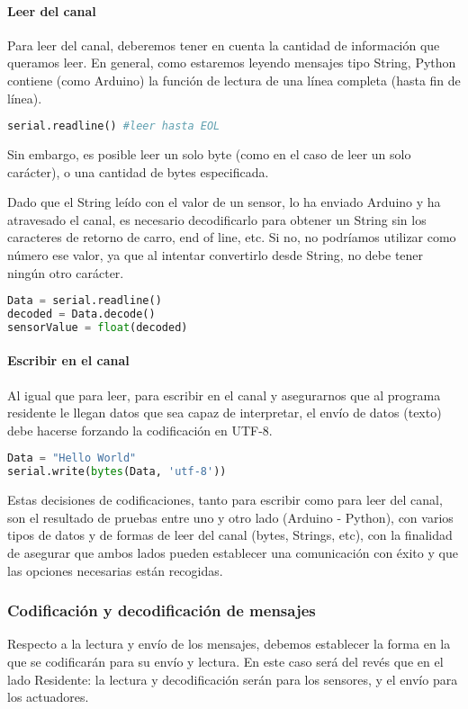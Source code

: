 \paragraph {Leer del canal} 
Para leer del canal, deberemos tener en cuenta la cantidad de información que queramos leer. En general, como estaremos leyendo mensajes tipo String, Python contiene (como Arduino) la función de lectura de una línea completa (hasta fin de línea). 
\begin{lstlisting}[language=python]
serial.readline() #leer hasta EOL		
\end{lstlisting}
Sin embargo, es posible leer un solo byte (como en el caso de leer un solo carácter), o una cantidad de bytes especificada.

Dado que el String leído con el valor de un sensor, lo ha enviado Arduino y ha atravesado el canal, es necesario decodificarlo para obtener un String sin los caracteres de retorno de carro, end of line, etc. Si no, no podríamos utilizar como número ese valor, ya que al intentar convertirlo desde String, no debe tener ningún otro carácter.
\begin{lstlisting}[language=python]	
Data = serial.readline()
decoded = Data.decode()
sensorValue = float(decoded)
\end{lstlisting}
	
	
\paragraph {Escribir en el canal} Al igual que para leer, para escribir en el canal y asegurarnos que al programa residente le llegan datos que sea capaz de interpretar, el envío de datos (texto) debe hacerse forzando la codificación en UTF-8.
\begin{lstlisting}[language=python]
Data = "Hello World"
serial.write(bytes(Data, 'utf-8'))
\end{lstlisting}

Estas decisiones de codificaciones, tanto para escribir como para leer del canal, son el resultado de pruebas entre uno y otro lado (Arduino - Python), con varios tipos de datos y de formas de leer del canal (bytes, Strings, etc), con la finalidad de asegurar que ambos lados pueden establecer una comunicación con éxito y que las opciones necesarias están recogidas.

\subsubsection{Codificación y decodificación de mensajes}\label{subsubsec:mensajesPython}
Respecto a la lectura y envío de los mensajes, debemos establecer la forma en la que se codificarán para su envío y lectura. En este caso será del revés que en el lado Residente: la lectura y decodificación serán para los sensores, y el envío para los actuadores. 


